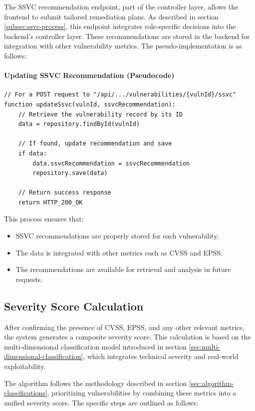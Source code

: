 The \ac{SSVC} recommendation endpoint, part of the controller layer, allows the frontend to submit tailored remediation plans. As described in section \ref{subsec:ssvc-process}, this endpoint integrates role-specific decisions into the backend’s controller layer. These recommendations are stored in the backend for integration with other vulnerability metrics. The pseudo-implementation is as follows:

\noindent
\paragraph{Updating SSVC Recommendation (Pseudocode)}
\label{par:update-ssvc-recommendation}

\begin{verbatim}
// For a POST request to "/api/.../vulnerabilities/{vulnId}/ssvc"
function updateSsvc(vulnId, ssvcRecommendation):
    // Retrieve the vulnerability record by its ID
    data = repository.findById(vulnId)
    
    // If found, update recommendation and save
    if data:
        data.ssvcRecommendation = ssvcRecommendation
        repository.save(data)
    
    // Return success response
    return HTTP_200_OK
\end{verbatim}

This process ensures that:
\begin{itemize}
  \item \ac{SSVC} recommendations are properly stored for each vulnerability.
  \item The data is integrated with other metrics such as \ac{CVSS} and \ac{EPSS}.
  \item The recommendations are available for retrieval and analysis in future requests.
\end{itemize}

\subsection{Severity Score Calculation}
\label{subsec:severity-score}

After confirming the presence of \ac{CVSS}, \ac{EPSS}, and any other relevant metrics, the system generates a composite severity score. This calculation is based on the multi-dimensional classification model introduced in section \ref{sec:multi-dimensional-classification}, which integrates technical severity and real-world exploitability.

The algorithm follows the methodology described in section \ref{sec:algorithm-classifications}, prioritizing vulnerabilities by combining these metrics into a unified severity score. The specific steps are outlined as follows:

